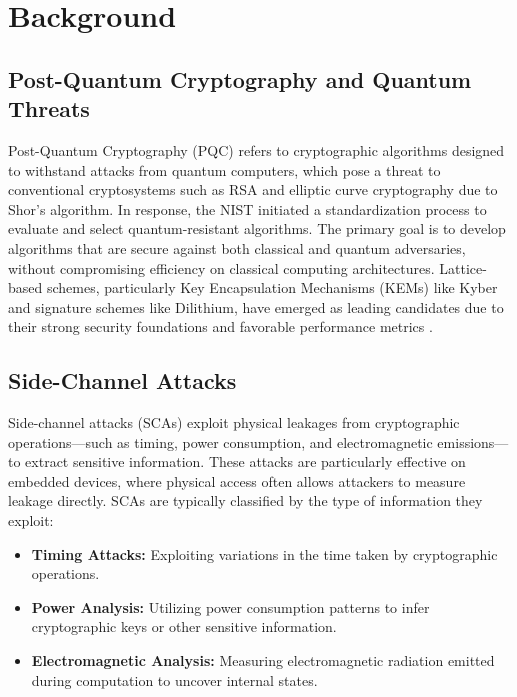 \chapter{Background}

\section{Post-Quantum Cryptography and Quantum Threats}

Post-Quantum Cryptography (\ac{PQC}) refers to cryptographic algorithms designed to withstand attacks from quantum computers, which pose a threat to conventional cryptosystems such as RSA and elliptic curve cryptography due to Shor’s algorithm. In response, the \ac{NIST} initiated a standardization process to evaluate and select quantum-resistant algorithms. The primary goal is to develop algorithms that are secure against both classical and quantum adversaries, without compromising efficiency on classical computing architectures. Lattice-based schemes, particularly Key Encapsulation Mechanisms (\acp{KEM}) like Kyber and signature schemes like Dilithium, have emerged as leading candidates due to their strong security foundations and favorable performance metrics \cite{Azouaoui22}.

\section{Side-Channel Attacks}

Side-channel attacks (\acp{SCA}) exploit physical leakages from cryptographic operations—such as timing, power consumption, and electromagnetic emissions—to extract sensitive information. These attacks are particularly effective on embedded devices, where physical access often allows attackers to measure leakage directly. \acp{SCA} are typically classified by the type of information they exploit:

\begin{itemize}
    \item \textbf{Timing Attacks:} Exploiting variations in the time taken by cryptographic operations.
    \item \textbf{Power Analysis:} Utilizing power consumption patterns to infer cryptographic keys or other sensitive information.
    \item \textbf{Electromagnetic Analysis:} Measuring electromagnetic radiation emitted during computation to uncover internal states.
\end{itemize}

